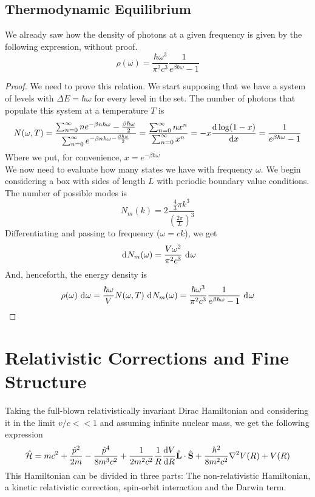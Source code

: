 \documentclass[../qm.tex]{subfiles}
\begin{document}
	\subsection{Thermodynamic Equilibrium}
	We already saw how the density of photons at a given frequency is given by the following expression, without proof.
	\begin{equation*}
		\rho(\omega)=\frac{\hbar\omega^3}{\pi^2c^3}\frac{1}{e^{\beta\hbar\omega}-1}
	\end{equation*}
	\begin{proof}
		We need to prove this relation. We start supposing that we have a system of levels with $\Delta E=\hbar\omega$ for every level in the set. The number of photons that populate this system at a temperature $T$ is
		\begin{equation}
			N(\omega,T)=\frac{\sum_{n=0}^{\infty}ne^{-\beta n\hbar\omega}-\frac{\beta\hbar\omega}{2}}{\sum_{n=0}^{\infty}e^{-\beta n\hbar\omega-\frac{\beta\hbar\omega}{2}}}=\frac{\sum_{n=0}^{\infty}nx^n}{\sum_{n=0}^{\infty}x^n}=-x\derivative{\log(1-x)}{x}=\frac{1}{e^{\beta\hbar\omega}-1}
			\label{eq:numberofphotonsaeq}
		\end{equation}
		Where we put, for convenience, $x=e^{-\beta\hbar\omega}$\\
		We now need to evaluate how many states we have with frequency $\omega$. We begin considering a box with sides of length $L$ with periodic boundary value conditions. The number of possible modes is
		\begin{equation*}
			N_m(k)=2\frac{\frac{4}{3}\pi k^3}{\left( \frac{2\pi}{L} \right)^3}
		\end{equation*}
		Differentiating and passing to frequency ($\omega=ck$), we get
		\begin{equation}
			\ \mathrm{d}^{}N_m(\omega)=\frac{V\omega^2}{\pi^2c^3}\ \mathrm{d}^{}\omega
			\label{eq:frequencymodes}
		\end{equation}
		And, henceforth, the energy density is
		\begin{equation}
			\rho(\omega)\ \mathrm{d}^{}\omega=\frac{\hbar\omega}{V}N(\omega,T)\ \mathrm{d}^{}N_m(\omega)=\frac{\hbar\omega^3}{\pi^2c^3}\frac{1}{e^{\beta\hbar\omega}-1}\ \mathrm{d}^{}\omega
			\label{eq:rhoomegamodesproof}
		\end{equation}
	\end{proof}
	\section{Relativistic Corrections and Fine Structure}
	Taking the full-blown relativistically invariant Dirac Hamiltonian and considering it in the limit $v/c<<1$ and assuming infinite nuclear mass, we get the following expression
	\begin{equation}
		\opr{\ham}=mc^2+\frac{\opr{p}^2}{2m}-\frac{\opr{p}^4}{8m^3c^2}+\frac{1}{2m^2c^2}\frac{1}{R}\derivative{V}{R}\vecopr{L}\cdot\vecopr{S}+\frac{\hbar^2}{8m^2c^2}\nabla^2V(R)+V(R)
		\label{eq:dirachamiltonianslowspeed}
	\end{equation}
	This Hamiltonian can be divided in three parts: The non-relativistic Hamiltonian, a kinetic relativistic correction, spin-orbit interaction and the Darwin term.\\
\end{document}
